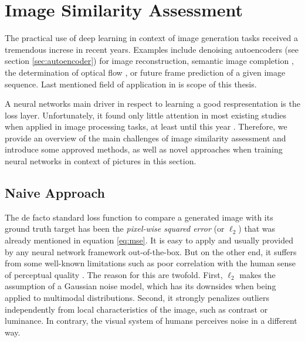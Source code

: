 \section{Image Similarity Assessment}

The practical use of deep learning in context of image generation tasks received a tremendous increse in recent years. Examples include denoising autoencoders (see section \ref{sec:autoencoder}) for image reconstruction, semantic image completion \parencite{sem-img-inpainting}, the determination of optical flow \parencite{flownet}, \parencite{flow-static-img} or future  frame prediction of a given image sequence. Last mentioned field of application in is scope of this thesis. 

A neural networks main driver in respect to learning a good respresentation is the loss layer. Unfortunately, it found only little attention in most existing studies when applied in image processing tasks, at least until this year \parencite{loss-func-img-proc}. Therefore, we provide an overview of the main challenges of image similarity assessment and introduce some approved methods, as well as novel approaches when training neural networks in context of pictures in this section.


\subsection{Naive Approach}

The de facto standard loss function to compare a generated image with its ground truth target has been the \textit{pixel-wise squared error} (or $ \ell_{2} $) that was already mentioned in equation \ref{eq:mse}. It is easy to apply and usually provided by any neural network framework out-of-the-box. But on the other end, it suffers from some well-known limitations such as poor correlation with the human sense of perceptual quality \parencite{loss-func-img-proc}. The reason for this are twofold. First, $ \ell_{2} $ makes the assumption of a Gaussian noise model, which has its downsides when being applied to multimodal distributions. Second, it strongly penalizes outliers independently from local characteristics of the image, such as contrast or luminance. In contrary, the visual system of humans perceives noise in a different way.

